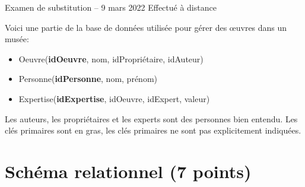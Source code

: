 %
{Examen de substitution -- 9 mars 2022}%
{Effectué à distance}%


Voici une partie de la base de données utilisée pour gérer des {\oe}uvres
dans un musée:

\begin{itemize}
  \item Oeuvre(\textbf{idOeuvre}, nom, idPropriétaire, idAuteur)
  \item Personne(\textbf{idPersonne}, nom, prénom)
  \item Expertise(\textbf{idExpertise}, idOeuvre, idExpert,  valeur)
\end{itemize}

Les auteurs, les propriétaires et les experts sont des personnes bien entendu. Les clés primaires sont en gras,
les clés primaires ne sont pas explicitement indiquées.


\section{Schéma relationnel (7 points)}

